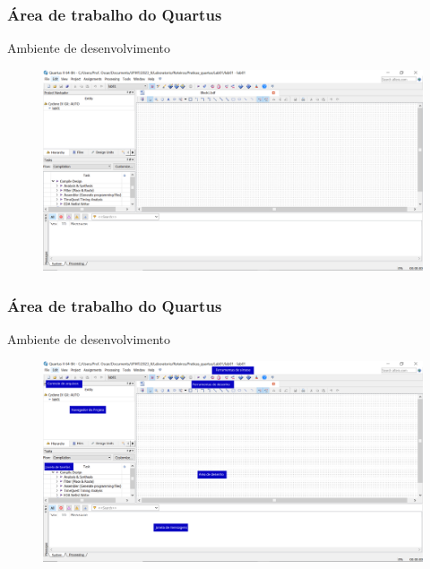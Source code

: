 \documentclass{CPSPresentation}
\begin{document}
\begin{frame}
	\frametitle{Área de trabalho do Quartus}
	
	\begin{block}{}
		\justifying
		Ambiente de desenvolvimento
	\end{block}
	
	\begin{figure}[h]
		\centering
		\includegraphics[width=1.02\textwidth]{quartus/fig16.png}
	\end{figure}
	
	
\end{frame}
\begin{frame}
	\frametitle{Área de trabalho do Quartus}
	
	\begin{block}{}
		\justifying
		Ambiente de desenvolvimento
	\end{block}
	
	\begin{figure}[h]
		\centering
		\includegraphics[width=1.02\textwidth]{quartus/fig04.pdf}
	\end{figure}
	
	
\end{frame}
\end{document}
